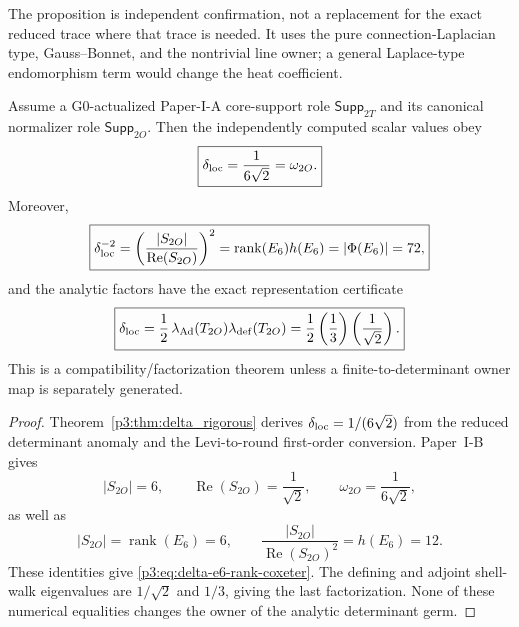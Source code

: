 \documentclass[11pt,a4paper]{article}
\begin{document}
\begin{remark}
The proposition is independent confirmation, not a replacement for the
exact reduced trace where that trace is needed.  It uses the pure
connection-Laplacian type, Gauss--Bonnet, and the nontrivial line owner; a
general Laplace-type endomorphism term would change the heat coefficient.
\end{remark}

\begin{corollary}
\label{p3:cor:delta-e6-root-denominator-strengthened}
Assume a G0-actualized Paper-I-A core-support role
\(\mathsf{Supp}_{2T}\) and its canonical normalizer role
\(\mathsf{Supp}_{2O}\).  Then the independently computed scalar values obey
\begin{equation}
\label{p3:eq:delta-2O-shell-value-match}
 \boxed{\delta_{\rm loc}=\frac1{6\sqrt2}=\omega_{2O}.}
\end{equation}
Moreover,
\begin{equation}
\label{p3:eq:delta-e6-rank-coxeter}
 \boxed{\delta_{\rm loc}^{-2}
 =\left(\frac{|S_{2O}|}{\operatorname{Re}(S_{2O})}\right)^2
 =\operatorname{rank}(E_6)h(E_6)
 =|\Phi(E_6)|=72,}
\end{equation}
and the analytic factors have the exact representation certificate
\begin{equation}
\label{p3:eq:delta-2O-representation-factorization}
 \boxed{\delta_{\rm loc}
 =\frac12\,\lambda_{\operatorname{Ad}}(T_{2O})
             \lambda_{\rm def}(T_{2O})
 =\frac12\left(\frac13\right)\left(\frac1{\sqrt2}\right).}
\end{equation}
This is a compatibility/factorization theorem unless a finite-to-determinant
owner map is separately generated.
\end{corollary}

\begin{proof}
Theorem~\ref{p3:thm:delta_rigorous} derives
\(\delta_{\rm loc}=1/(6\sqrt2)\) from the reduced determinant anomaly and
the Levi-to-round first-order conversion.  Paper~I-B gives
\[
 |S_{2O}|=6,\qquad
 \operatorname{Re}(S_{2O})=\frac1{\sqrt2},\qquad
 \omega_{2O}=\frac1{6\sqrt2},
\]
as well as
\[
 |S_{2O}|=\operatorname{rank}(E_6)=6,\qquad
 \frac{|S_{2O}|}{\operatorname{Re}(S_{2O})^2}=h(E_6)=12.
\]
These identities give \eqref{p3:eq:delta-e6-rank-coxeter}.  The defining
and adjoint shell-walk eigenvalues are \(1/\sqrt2\) and \(1/3\), giving the
last factorization.  None of these numerical equalities changes the owner of
the analytic determinant germ.
\end{proof}
\end{document}
